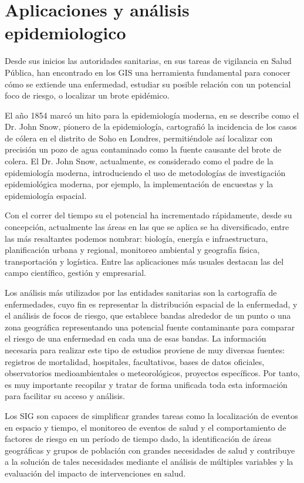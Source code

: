 \section{Aplicaciones y análisis epidemiologico}
\label{sec:cap2-aplicaciones-analisis-epidemiologico}

Desde sus inicios las autoridades sanitarias, en sus tareas de vigilancia en Salud Pública, han encontrado en los
GIS una  herramienta fundamental para conocer cómo se extiende una enfermedad, estudiar su posible relación con un
potencial foco de riesgo, o localizar un brote epidémico\cite{vgomesAegis2001}. 

El año 1854 marcó un hito para la epidemiología moderna, en \cite{jCerdaJohnSnow2007} se describe como el Dr.
John Snow, pionero de la epidemiología, cartografió la incidencia de los casos de cólera en el distrito de Soho en
Londres, permitiéndole así localizar con precisión un pozo de agua contaminado como la fuente causante del brote de
colera. El Dr. John Snow, actualmente, es considerado como el padre de la epidemiología moderna, introduciendo el
uso de metodologías de investigación epidemiológica moderna, por ejemplo, la implementación de encuestas y la
epidemiología espacial.

Con el correr del tiempo su el potencial ha incrementado rápidamente, desde su concepción, actualmente las áreas 
en las que se aplica se ha diversificado, entre las más resaltantes podemos nombrar: biología, energía e
infraestructura, planificación urbana y regional, monitoreo ambiental y geografía física, transportación y
logística. Entre las aplicaciones más usuales destacan las del campo científico, gestión y empresarial. 

Los análisis más utilizados por las entidades sanitarias son la cartografía de enfermedades, cuyo fin es
representar la distribución espacial de la enfermedad,  y el análisis de focos de riesgo, que establece 
bandas alrededor de un punto o una zona geográfica representando una potencial fuente contaminante para 
comparar el riesgo de una enfermedad en cada una de esas bandas. La información necesaria para realizar 
este tipo de estudios proviene de muy diversas fuentes: registros de mortalidad, hospitales, facultativos, 
bases de datos oficiales, observatorios medioambientales o meteorológicos, proyectos específicos. Por 
tanto, es muy importante recopilar y tratar de forma unificada toda esta información para facilitar su 
acceso y análisis.

Los SIG son capaces de simplificar grandes tareas como la localización de eventos en espacio y tiempo, 
el monitoreo de eventos de salud y el comportamiento de factores de riesgo en un período de tiempo dado, la
identificación de áreas geográficas y grupos de población con grandes necesidades de salud y contribuye a la
solución de tales necesidades mediante el análisis de múltiples variables y la evaluación del impacto de
intervenciones en salud\cite{iMolinaSigEpidemiologia}.
